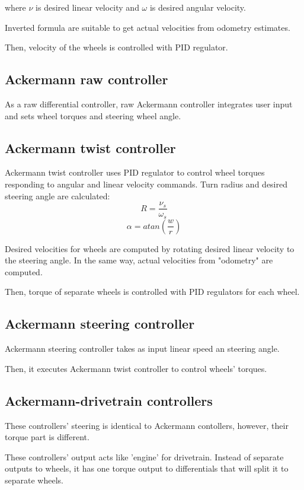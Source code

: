 \documentclass[a4paper,11pt]{article}
\begin{document}
where $\nu$ is desired linear velocity and $\omega$ is desired angular velocity.


Inverted formula are suitable to get actual velocities from odometry estimates.


Then, velocity of the wheels is controlled with PID regulator.

\subsection{Ackermann raw controller}

As a raw differential controller, raw Ackermann controller integrates user input and sets wheel torques and steering wheel angle.

\subsection{Ackermann twist controller}

Ackermann twist controller uses PID regulator to control wheel torques responding to angular and linear velocity commands. 
Turn radius and desired steering angle are calculated: 
\[
R = \frac{\nu_s}{\omega_s}
\]
\[
\alpha = atan(\frac{w}{r})
\]

Desired velocities for wheels are computed by rotating desired linear velocity to the steering angle. 
In the same way, actual velocities from "odometry" are computed.

Then, torque of separate wheels is controlled with PID regulators for each wheel.

\subsection{Ackermann steering controller}

Ackermann steering controller takes as input linear speed an steering angle. 

Then, it executes Ackermann twist controller to control wheels' torques. 

\subsection{Ackermann-drivetrain controllers}

These controllers' steering is identical to Ackermann contollers, however, their torque part is different. 

These controllers' output acts like 'engine' for drivetrain. Instead of separate outputs to wheels, it has one torque output to differentials that will split it to separate wheels. 


\nocite{*}


\end{document}
